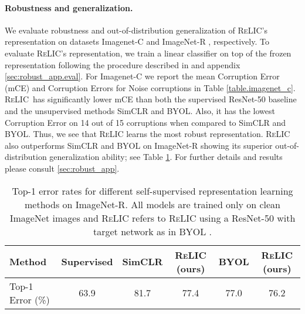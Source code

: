 \documentclass{article}
\newcommand{\relic}{\textsc{ReLIC}}
\begin{document}
\paragraph{Robustness and generalization.}
We evaluate robustness and out-of-distribution generalization of \relic{}'s representation on datasets Imagenet-C \citep{hendrycks2019robustness} and ImageNet-R \citep{hendrycks2020many}, respectively. 
To evaluate \relic{}'s representation, we train a linear classifier on top of the frozen representation following the procedure described in \citep{chen2020simple} and appendix \ref{sec:robust_app.eval}. 
For Imagenet-C we report the mean Corruption Error (mCE) and Corruption Errors for Noise corruptions in Table \ref{table.imagenet_c}.
\relic \, has significantly lower mCE than both the supervised ResNet-50 baseline and the unsupervised methods SimCLR and BYOL. 
Also, it has the lowest Corruption Error on 14 out of 15 corruptions when compared to SimCLR and BYOL.
Thus, we see that \relic{} learns the most robust representation. 
\relic \, also outperforms SimCLR and BYOL on ImageNet-R showing its superior out-of-distribution generalization ability; see Table \ref{table.imagenet_r}.
For further details and results please consult \ref{sec:robust_app}.

\begin{table}[ht]
\caption{Top-1 error rates for different self-supervised representation learning methods on ImageNet-R. All models are trained only on clean ImageNet images and \relic{} refers to \relic{} using a ResNet-50 with target network as in BYOL \citep{grill2020bootstrap}.}
\label{table.imagenet_r}
\begin{center}
\begin{tabular}{lccccc}
\hline
Method & Supervised & SimCLR & \relic{} (ours) & BYOL & \relic{} (ours) \\
\hline
Top-1 Error (\%) & 63.9 & 81.7 & 77.4 & 77.0 & 76.2  \\
\hline
\end{tabular}
\end{center}
\end{table}
\end{document}

